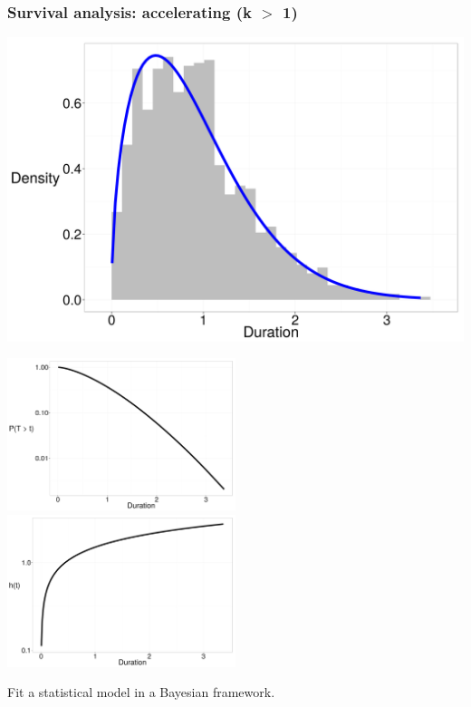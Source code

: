 \documentclass{beamer}
\begin{document}
\begin{frame}
  \frametitle{Survival analysis: accelerating (k \(>\) 1)}

  \begin{center}
    \includegraphics[height = 0.4\textheight, width = \textwidth, keepaspectratio = true]{figure/dur_acc}

    \includegraphics[height = 0.6\textheight, width = 0.5\textwidth, keepaspectratio = true]{figure/sur_acc}
    \includegraphics[height = 0.6\textheight, width = 0.5\textwidth, keepaspectratio = true]{figure/haz_acc}
  \end{center}
\end{frame}

\begin{frame}
  \begin{center}
    Fit a statistical model in a Bayesian framework.
  \end{center}
\end{frame}
\end{document}
